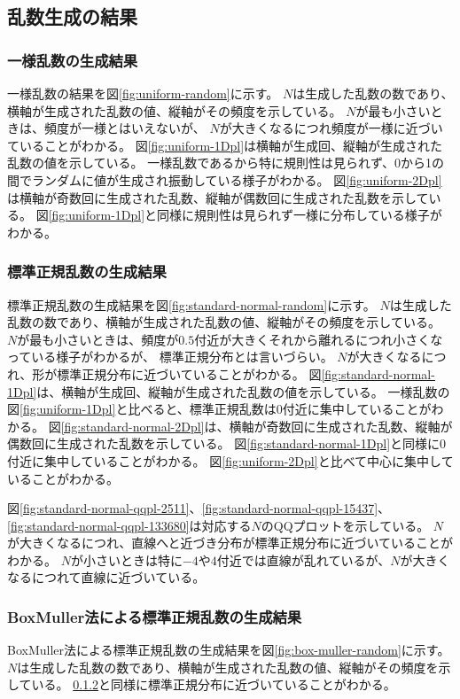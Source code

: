 \subsection{乱数生成の結果}

\subsubsection{一様乱数の生成結果}
一様乱数の結果を図\ref{fig:uniform-random}に示す。
$N$は生成した乱数の数であり、横軸が生成された乱数の値、縦軸がその頻度を示している。
$N$が最も小さいときは、頻度が一様とはいえないが、
$N$が大きくなるにつれ頻度が一様に近づいていることがわかる。
図\ref{fig:uniform-1Dpl}は横軸が生成回、縦軸が生成された乱数の値を示している。
一様乱数であるから特に規則性は見られず、0から1の間でランダムに値が生成され振動している様子がわかる。
図\ref{fig:uniform-2Dpl}は横軸が奇数回に生成された乱数、縦軸が偶数回に生成された乱数を示している。
図\ref{fig:uniform-1Dpl}と同様に規則性は見られず一様に分布している様子がわかる。


\subsubsection{標準正規乱数の生成結果}\label{subsubsec:standard-normal-random}
標準正規乱数の生成結果を図\ref{fig:standard-normal-random}に示す。
$N$は生成した乱数の数であり、横軸が生成された乱数の値、縦軸がその頻度を示している。
$N$が最も小さいときは、頻度が$0.5$付近が大きくそれから離れるにつれ小さくなっている様子がわかるが、
標準正規分布とは言いづらい。
$N$が大きくなるにつれ、形が標準正規分布に近づいていることがわかる。
図\ref{fig:standard-normal-1Dpl}は、横軸が生成回、縦軸が生成された乱数の値を示している。
一様乱数の図\ref{fig:uniform-1Dpl}と比べると、標準正規乱数は0付近に集中していることがわかる。
図\ref{fig:standard-normal-2Dpl}は、横軸が奇数回に生成された乱数、縦軸が偶数回に生成された乱数を示している。
図\ref{fig:standard-normal-1Dpl}と同様に0付近に集中していることがわかる。
図\ref{fig:uniform-2Dpl}と比べて中心に集中していることがわかる。

図\ref{fig:standard-normal-qqpl-2511}、\ref{fig:standard-normal-qqpl-15437}、\ref{fig:standard-normal-qqpl-133680}は対応する$N$のQQプロットを示している。
$N$が大きくなるにつれ、直線へと近づき分布が標準正規分布に近づいていることがわかる。
$N$が小さいときは特に$-4$や$4$付近では直線が乱れているが、$N$が大きくなるにつれて直線に近づいている。

\subsubsection{BoxMuller法による標準正規乱数の生成結果}\label{subsubsec:box-muller-random}
BoxMuller法による標準正規乱数の生成結果を図\ref{fig:box-muller-random}に示す。
$N$は生成した乱数の数であり、横軸が生成された乱数の値、縦軸がその頻度を示している。
\ref{subsubsec:standard-normal-random}と同様に標準正規分布に近づいていることがわかる。

